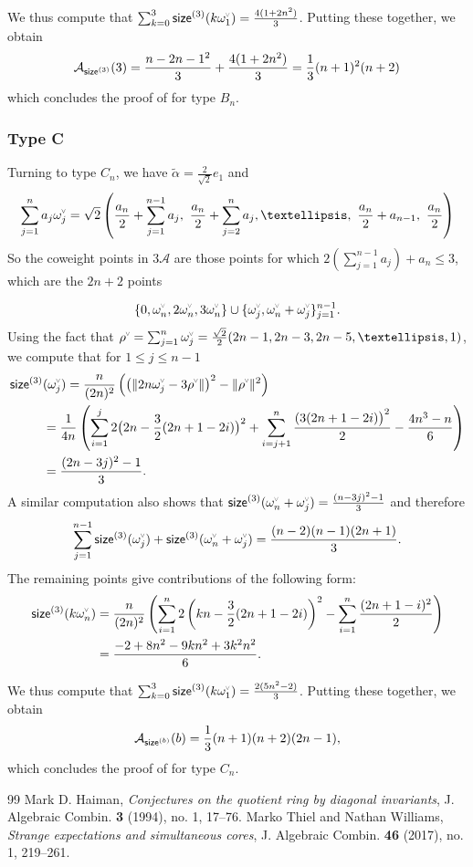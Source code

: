 \documentclass[10pt,a4paper]{amsart}
\newcommand{\chk}[1]{#1^{\normalfont\smash{\scalebox{.5}[.5]{\rotatebox{90}{\textbf{\textless}}}}}}
\newcommand{\ac}{\mathcal{A}}
\newcommand{\cw}{\chk{\omega}}
\newcommand{\size}{{\sf size}}
\newcommand{\sizeb}{\size^{(b)}}
\theoremstyle{definition}
\theoremstyle{remark}
\begin{document}
We thus compute that $\sum_{k=0}^3 \size^{(3)}(k\cw_1)= \frac{4(1 + 2 n^2)}{3}$. Putting these together, we obtain 
$$ \ac_{\size^{(3)}}(3) = \frac{{n-2}{n-1}^2}{3} + \frac{4(1+2n^2)}{3} = \frac{1}{3}(n+1)^2(n+2) $$
which concludes the proof of  for type $B_n$.


\subsubsection{Type C}
\label{sec:type_c_calc}
Turning to type $C_n$, we have $\widetilde{\alpha}=\frac{2}{\sqrt{2}}e_1$ and
$$\sum_{j=1}^n a_j \cw_j = \sqrt{2}\left(\frac{a_n}{2}+\sum_{j=1}^{n-1} a_j,~\frac{a_n}{2}+\sum_{j=2}^n a_j,\ldots,~\frac{a_n}{2}+a_{n-1},~\frac{a_n}{2}\right)$$
So the coweight points in $3\ac$ are those points for which $2(\sum_{j=1}^{n-1} a_j)+a_n \leq 3$, which are the $2n+2$ points

\[\{0,\cw_n,2\cw_n,3\cw_n\}\cup \{\cw_j,\cw_n+\cw_j\}_{j=1}^{n-1}.\]
Using the fact that $\chk{\rho}=\sum_{j=1}^n \cw_j = \frac{\sqrt{2}}{2}(2n-1,2n-3,2n-5,\ldots,1)$, we compute that for $1 \leq j \leq n-1$
\begin{align*}
\size^{(3)}&(\cw_j) = \frac{n}{(2n)^2}\left( \left(\|2n\cw_j-3\chk{\rho}\|\right)^2-\|\chk{\rho}\|^2\right) \\ &=
\frac{1}{4n}\left( \sum_{i=1}^j 2\big(2n-\frac{3}{2}(2n+1-2i)\big)^2+\sum_{i=j+1}^n \frac{(3(2n+1-2i)\big)^2}{2} -\frac{4n^3-n}{6}\right) \\ 
 &= \frac{(2n-3j)^2-1}{3}.
\end{align*}
A similar computation also shows that $\size^{(3)}(\cw_n+\cw_j) = \frac{(n-3j)^2-1}{3}$ and therefore
\[\sum_{j=1}^{n-1} \size^{(3)}(\cw_j)+\size^{(3)}(\cw_n+\cw_j) = \frac{(n-2) (n-1)(2n+1)}{3}.\]
The remaining points give contributions of the following form:
\begin{align*}
\size^{(3)}(k\cw_n) &= \frac{n}{(2 n)^2} \left(
     \sum_{i=1}^n 2 \left(kn-\frac{3}{2}(2n+1-2i)\right)^2 -\sum_{i=1}^n \frac{(2n+1-i)^2}{2} \right) \\
    &=\frac{-2+8 n^2-9 k n^2+3 k^2 n^2}{6}.
\end{align*}

We thus compute that $\sum_{k=0}^3 \size^{(3)}(k\cw_1)  = \frac{2(5n^2-2)}{3}$. Putting these together, we obtain
$$ \ac_{\sizeb}(b) = \frac{1}{3}(n+1)(n+2)(2n-1),$$
which concludes the proof of  for type $C_n$.

\begin{thebibliography}{99}
 Mark D. Haiman, \emph{Conjectures on the quotient ring by diagonal invariants}, J. Algebraic Combin. \textbf{3} (1994), no. 1, 17--76.
 Marko Thiel and Nathan Williams, \emph{Strange expectations and simultaneous cores}, J. Algebraic Combin. \textbf{46} (2017), no. 1, 219--261.
\end{thebibliography}
\end{document}
